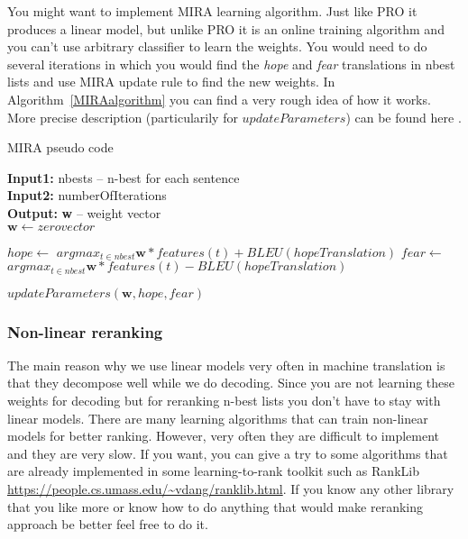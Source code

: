 You might want to implement MIRA learning algorithm. Just like PRO it produces a linear model, but unlike PRO it is an online training algorithm and you can't use arbitrary classifier to learn the weights. You would need to do several iterations in which you would find the \textit{hope} and \textit{fear} translations in nbest lists and use MIRA update rule to find the new weights. In Algorithm~\ref{MIRAalgorithm} you can find a very rough idea of how it works. More precise description (particularily for $updateParameters$) can be found here  \cite{Eidelman:2012:OSO:2393015.2393082}.

\begin{algorithm}
\caption{MIRA pseudo code}
\label{MIRAalgorithm}
\begin{algorithmic}

 \STATE \textbf{Input1: } nbests -- n-best for each sentence \\
 \STATE \textbf{Input2: } numberOfIterations \\
 
 \STATE \textbf{Output: } \textbf{w} -- weight vector \\
 
 \STATE $\boldsymbol{w}\leftarrow zero vector$
 

   \STATE $hope \leftarrow$ $argmax_{t \in nbest} \boldsymbol{w}*features(t) + BLEU(hopeTranslation)$
   \STATE $fear \leftarrow$ $argmax_{t \in nbest} \boldsymbol{w}*features(t) - BLEU(hopeTranslation)$
   
   \STATE $updateParameters(\textbf{w}, hope, fear)$
  \ENDFOR
  
 \ENDFOR
 
\end{algorithmic}
\end{algorithm}

\subsubsection{Non-linear reranking}

The main reason why we use linear models very often in machine translation is that they decompose well while we do decoding. Since you are not learning these weights for decoding but for reranking n-best lists you don't have to stay with linear models. There are many learning algorithms that can train non-linear models for better ranking. However, very often they are difficult to implement and they are very slow. If you want, you can give a try to some algorithms that are already implemented in some learning-to-rank toolkit such as RankLib \url{https://people.cs.umass.edu/~vdang/ranklib.html}. If you know any other library that you like more or know how to do anything that would make reranking approach be better feel free to do it.
